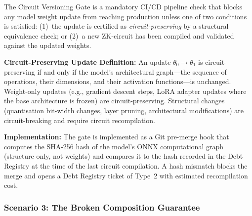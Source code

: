 \begin{tcolorbox}[debtpattern,
  title={Debt Management Pattern 2 --- Circuit Versioning Gate}]

The Circuit Versioning Gate is a mandatory CI/CD pipeline
check that blocks any model weight update from reaching
production unless one of two conditions is satisfied:
(1)~the update is certified as \emph{circuit-preserving} by
a structural equivalence check; or (2)~a new ZK-circuit has
been compiled and validated against the updated weights.

\textbf{Circuit-Preserving Update Definition:}
An update $\theta_0 \to \theta_1$ is circuit-preserving if
and only if the model's architectural graph---the sequence
of operations, their dimensions, and their activation
functions---is unchanged.
Weight-only updates (e.g., gradient descent steps, LoRA
adapter updates where the base architecture is frozen)
are circuit-preserving.
Structural changes (quantisation bit-width changes, layer
pruning, architectural modifications) are circuit-breaking
and require circuit recompilation.

\textbf{Implementation:}
The gate is implemented as a Git pre-merge hook that computes
the SHA-256 hash of the model's ONNX computational graph
(structure only, not weights) and compares it to the hash
recorded in the Debt Registry at the time of the last
circuit compilation.
A hash mismatch blocks the merge and opens a Debt Registry
ticket of Type~2 with estimated recompilation cost.
\end{tcolorbox}

\subsubsection{Scenario 3: The Broken Composition Guarantee}
\label{subsubsec:scenario-composition}

